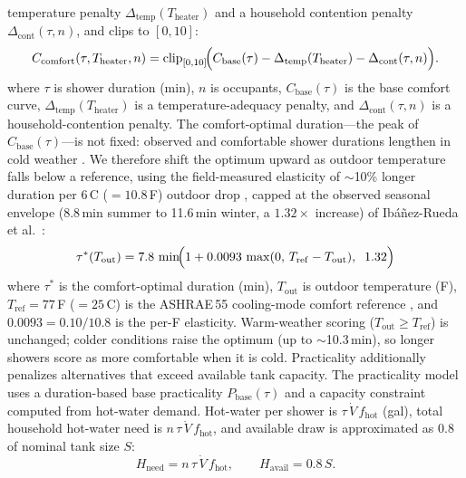 \documentclass[final,3p,times]{elsarticle}
\begin{document}
temperature penalty $\Delta_{\mathrm{temp}}(T_{\mathrm{heater}})$ and a household contention
penalty $\Delta_{\mathrm{cont}}(\tau,n)$, and clips to $[0,10]$:
\begin{equation}
  C_{\mathrm{comfort}}(\tau,T_{\mathrm{heater}},n)
  = \mathrm{clip}_{[0,10]}\!\Bigl(C_{\mathrm{base}}(\tau)
  -\Delta_{\mathrm{temp}}(T_{\mathrm{heater}})
  -\Delta_{\mathrm{cont}}(\tau,n)\Bigr).
  \label{eq:shower_comfort_full}
\end{equation}
\noindent where $\tau$ is shower duration (min), $n$ is occupants, $C_{\mathrm{base}}(\tau)$ is the base comfort curve,
$\Delta_{\mathrm{temp}}(T_{\mathrm{heater}})$ is a temperature-adequacy penalty, and $\Delta_{\mathrm{cont}}(\tau,n)$ is a household-contention penalty.
The comfort-optimal duration---the peak of $C_{\mathrm{base}}(\tau)$---is not fixed: observed and
comfortable shower durations lengthen in cold weather \cite{wong2022,ibanezrueda2023}. We therefore
shift the optimum upward as outdoor temperature falls below a reference, using the field-measured
elasticity of $\sim$10\% longer duration per 6\,\textdegree{}C ($=10.8$\,\textdegree{}F) outdoor drop
\cite{wong2022}, capped at the observed seasonal envelope (8.8\,min summer to 11.6\,min winter, a
$1.32\times$ increase) of Ib\'a\~nez-Rueda et al.\ \cite{ibanezrueda2023}:
\begin{equation}
  \tau^{*}(T_{\mathrm{out}}) = 7.8\,\min\!\Bigl(1 + 0.0093\,\max(0,\,T_{\mathrm{ref}} - T_{\mathrm{out}}),\;\; 1.32\Bigr)
  \label{eq:shower_optimal_duration}
\end{equation}
\noindent where $\tau^{*}$ is the comfort-optimal duration (min), $T_{\mathrm{out}}$ is outdoor temperature
(\textdegree{}F), $T_{\mathrm{ref}} = 77$\,\textdegree{}F ($=25$\,\textdegree{}C) is the ASHRAE\,55
cooling-mode comfort reference \cite{ashrae55}, and $0.0093 = 0.10/10.8$ is the per-\textdegree{}F
elasticity. Warm-weather scoring ($T_{\mathrm{out}}\ge T_{\mathrm{ref}}$) is unchanged; colder
conditions raise the optimum (up to $\sim$10.3\,min), so longer showers score as more comfortable when it is cold.
Practicality additionally penalizes alternatives that exceed available tank
capacity. The practicality model uses a duration-based base practicality $P_{\mathrm{base}}(\tau)$ and
a capacity constraint computed from hot-water demand. Hot-water per shower is
$\tau\,\dot V\,f_{\mathrm{hot}}$ (gal), total household hot-water need is
$n\,\tau\,\dot V\,f_{\mathrm{hot}}$, and available draw is approximated as $0.8$ of nominal
tank size $S$:
\begin{equation}
  H_{\mathrm{need}} = n\,\tau\,\dot V\,f_{\mathrm{hot}}, \qquad
  H_{\mathrm{avail}} = 0.8\,S.
  \label{eq:shower_capacity_need_avail}
\end{equation}
\end{document}
